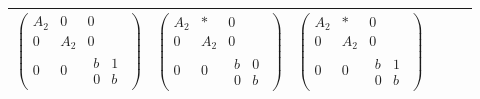 \documentclass[11pt,a4paper]{article}
\theoremstyle{plain}
\theoremstyle{definition}
\theoremstyle{remark}
\begin{document}
\begin{center}
\begin{tabular}{|c|c|cccc|}
$\begin{pmatrix}
A_2 & 0 & 0 \\
0   & A_2 & 0 \\
0   & 0   & \begin{matrix} b & 1 \\ 0 & b \end{matrix}
\end{pmatrix}$ &$\begin{pmatrix}
A_2 & * & 0 \\
0   & A_2 & 0 \\
0   & 0   & \begin{matrix} b & 0 \\ 0 & b \end{matrix}
\end{pmatrix}$ &$\begin{pmatrix}
A_2 & * & 0 \\
0   & A_2 & 0 \\
0   & 0   & \begin{matrix} b & 1 \\ 0 & b \end{matrix}
\end{pmatrix}$ \\ \hline
\end{tabular}
\end{center}




\newpage
\end{document}
